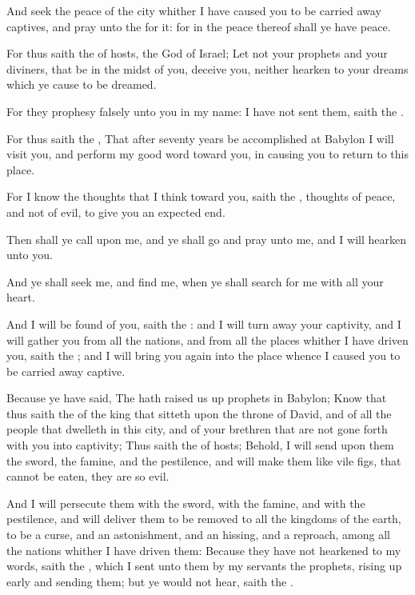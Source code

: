 \Verse And seek the peace of the city whither I have caused you to be carried away captives, and pray unto the \LORD for it: for in the peace thereof shall ye have peace.

\Verse For thus saith the \LORD of hosts, the God of Israel; Let not your prophets and your diviners, that be in the midst of you, deceive you, neither hearken to your dreams which ye cause to be dreamed.

\Verse For they prophesy falsely unto you in my name: I have not sent them, saith the \LORD.

\Verse For thus saith the \LORD, That after seventy years be accomplished at Babylon I will visit you, and perform my good word toward you, in causing you to return to this place.

\Verse For I know the thoughts that I think toward you, saith the \LORD, thoughts of peace, and not of evil, to give you an expected end.

\Verse Then shall ye call upon me, and ye shall go and pray unto me, and I will hearken unto you.

\Verse And ye shall seek me, and find me, when ye shall search for me with all your heart.

\Verse And I will be found of you, saith the \LORD: and I will turn away your captivity, and I will gather you from all the nations, and from all the places whither I have driven you, saith the \LORD; and I will bring you again into the place whence I caused you to be carried away captive.

\Verse Because ye have said, The \LORD hath raised us up prophets in Babylon; \Verse Know that thus saith the \LORD of the king that sitteth upon the throne of David, and of all the people that dwelleth in this city, and of your brethren that are not gone forth with you into captivity; \Verse Thus saith the \LORD of hosts; Behold, I will send upon them the sword, the famine, and the pestilence, and will make them like vile figs, that cannot be eaten, they are so evil.

\Verse And I will persecute them with the sword, with the famine, and with the pestilence, and will deliver them to be removed to all the kingdoms of the earth, to be a curse, and an astonishment, and an hissing, and a reproach, among all the nations whither I have driven them: \Verse Because they have not hearkened to my words, saith the \LORD, which I sent unto them by my servants the prophets, rising up early and sending them; but ye would not hear, saith the \LORD.

